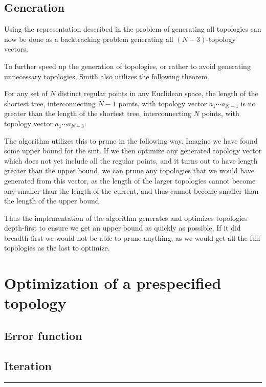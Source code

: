 \subsection{Generation}
\label{sec:generation}

Using the representation described in  the problem of
generating all topologies can now be done as a backtracking problem generating
all $(N-3)$-topology vectors.


To further speed up the generation of topologies, or rather to avoid generating
unnecessary topologies, Smith also utilizes the following theorem

\begin{theorem}
For any set of $N$ distinct regular points in any Euclidean space, the length of
the shortest tree, interconnecting $N-1$ points, with topology vector $a_1
\cdots a_{N-4}$ is no greater than the length of the shortest tree,
interconnecting $N$ points, with topology vector $a_1 \cdots a_{N-3}$.
\end{theorem}


The algorithm utilizes this to prune in the following way. Imagine we have found
some upper bound for the \gls{smt}. If we then optimize any generated topology
vector which does not yet include all the regular points, and it turns out to
have length greater than the upper bound, we can prune any topologies that we
would have generated from this vector, as the length of the larger topologies
cannot become any smaller than the length of the current, and thus cannot become
smaller than the length of the upper bound.

Thus the implementation of the algorithm generates and optimizes topologies
depth-first to ensure we get an upper bound as quickly as possible. If it did
breadth-first we would not be able to prune anything, as we would get all the
full topologies as the last to optimize.

\section{Optimization of a prespecified topology}
\label{sec:optim-topol}

\subsection{Error function}
\label{sec:error-function}

\subsection{Iteration}
\label{sec:iter-fixm-could}


\par\fancybreak{$***$}\par

